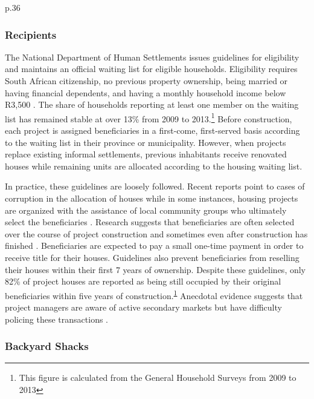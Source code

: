\documentclass[12pt]{article}
\begin{document}
p.36







\subsubsection{Recipients}

The National Department of Human Settlements issues guidelines for eligibility and maintains an official waiting list for eligible households.  Eligibility requires South African citizenship, no previous property ownership, being married or having financial dependents, and having a monthly household income below R3,500 \citep{seriq}. The share of households reporting at least one member on the waiting list has remained stable at over 13\% from 2009 to 2013.\footnote{\label{GHSnote}This figure is calculated from the General Household Surveys from 2009 to 2013}  Before construction, each project is assigned beneficiaries in a first-come, first-served basis according to the waiting list in their province or municipality. However, when projects replace existing informal settlements, previous inhabitants receive renovated houses while remaining units are allocated according to the housing waiting list. %

In practice, these guidelines are loosely followed.  Recent reports point to cases of corruption in the allocation of houses while in some instances, housing projects are organized with the assistance of local community groups who ultimately select the beneficiaries \citep{seriq,casestudytinazonke}.  Research suggests that beneficiaries are often selected over the course of project construction and sometimes even after construction has finished \citep{seriq}. Beneficiaries are expected to pay a small one-time payment in order to receive title for their houses.  Guidelines also prevent beneficiaries from reselling their houses within their first 7 years of ownership.  Despite these guidelines, only 82\% of project houses are reported as being still occupied by their original beneficiaries within five years of construction.\textsuperscript{\ref{GHSnote}} Anecdotal evidence suggests that project managers are aware of active secondary markets but have difficulty policing these transactions \citep{resale}.  


\subsubsection{Backyard Shacks}
\end{document}

